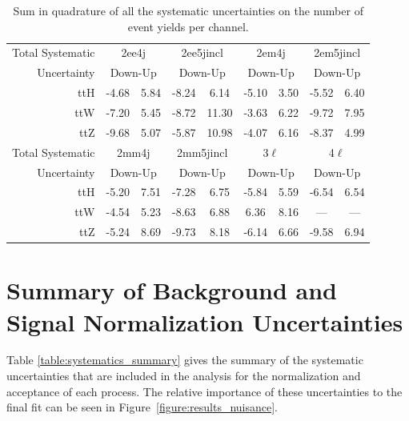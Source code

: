 \begin{table}
\begin{center}
\begin{tabular}{r|cc|cc|cc|cc|}
Total Systematic & \multicolumn{2}{c|}{2ee4j} & \multicolumn{2}{c|}{2ee5jincl} & \multicolumn{2}{c|}{2em4j} & \multicolumn{2}{c|}{2em5jincl} \\ 
Uncertainty & \multicolumn{2}{c|}{Down-Up} & \multicolumn{2}{c|}{Down-Up} & \multicolumn{2}{c|}{Down-Up} & \multicolumn{2}{c|}{Down-Up} \\ 
\hline 
ttH & -4.68 & 5.84 & -8.24 & 6.14 & -5.10 & 3.50 & -5.52 & 6.40   \\ 
ttW & -7.20 & 5.45 & -8.72 & 11.30 & -3.63 & 6.22 & -9.72 & 7.95 \\ 
ttZ & -9.68 & 5.07 & -5.87 & 10.98 & -4.07 & 6.16 & -8.37 & 4.99 \\ 
\hline 
Total Systematic & \multicolumn{2}{c|}{2mm4j}& \multicolumn{2}{c|}{2mm5jincl} & \multicolumn{2}{c|}{3$\ell$} & \multicolumn{2}{c|}{4$\ell$} \\ 
Uncertainty & \multicolumn{2}{c|}{Down-Up} &\multicolumn{2}{c|}{Down-Up} & \multicolumn{2}{c|}{Down-Up} & \multicolumn{2}{c|}{Down-Up} \\ 
\hline 
ttH &-5.20 & 7.51& -7.28 & 6.75 & -5.84 & 5.59 & -6.54 & 6.54\\ 
ttW &-4.54 & 5.23& -8.63 & 6.88 &  6.36 & 8.16 & --- & --- \\ 
ttZ &-5.24 & 8.69& -9.73 & 8.18 & -6.14 & 6.66 & -9.58 & 6.94\\ 
\end{tabular} 
\caption{Sum in quadrature of all the systematic uncertainties on the number of event yields per channel.}
\label{table:systematics_total_detector} 
\end{center} 
\end{table} 


\section{Summary of Background and Signal Normalization Uncertainties}

Table \ref{table:systematics_summary} gives the summary of the systematic uncertainties that are included in the analysis for the normalization and acceptance of each process. The relative importance of these uncertainties to the final fit can be seen in Figure~\ref{figure:results_nuisance}.  


